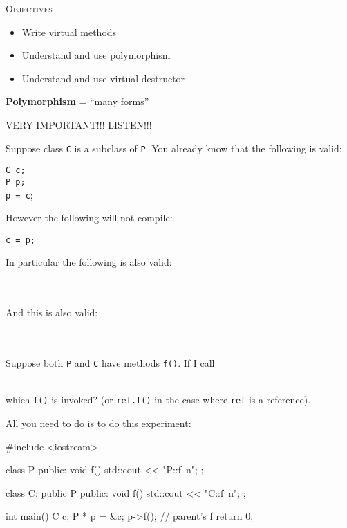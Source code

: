 \newpage{}

\textsc{Objectives}

\begin{itemize}
\item
  Write virtual methods
\item
  Understand and use polymorphism
\item
  Understand and use virtual destructor
\end{itemize}

\newpage{}

\textbf{Polymorphism} = ``many forms''

VERY IMPORTANT!!! LISTEN!!!

Suppose class \texttt{C} is a subclass of \texttt{P}. You already know that
the following is valid:
\begin{center}
\verb!C c;!\\
\verb!P p;!\\
\verb!p = c!;\\
\end{center}
However the following will not compile:
\begin{center}
\texttt{c = p;}
\end{center}
In particular the following is also valid:

\\
\\

And this is also valid:

\\
\\

Suppose both \texttt{P} and \texttt{C} have methods \texttt{f()}. If I call

\\

which \texttt{f()} is invoked? (or \texttt{ref.f()} in the case where
\texttt{ref} is a reference).

All you need to do is to do this experiment:

\begin{console}
#include <iostream>

class P
{   
public:
     void f()
     {    
          std::cout << "P::f\ n";
     }
};

class C: public P
{
public:
     void f()
     {    
          std::cout << "C::f\ n";
     }
};

int main()
{   
    C c;
    P * p = &c;
    p->f(); // parent's f
    return 0;
}
\end{console}

